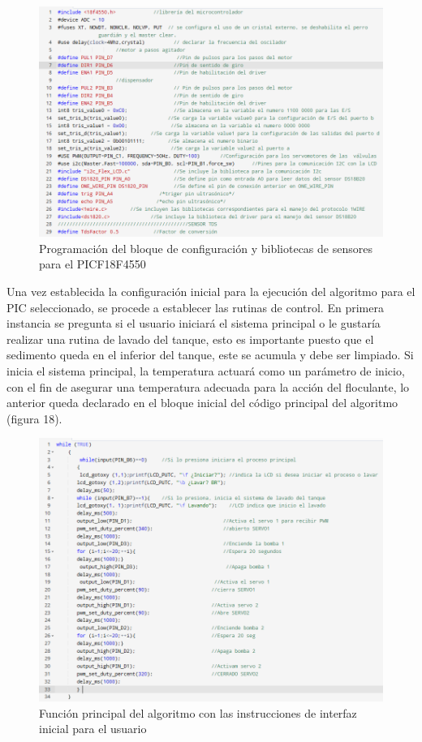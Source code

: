 \documentclass[conference]{IEEEtran}
\begin{document}
\begin{figure}[htbp]
	\centering
	\includegraphics[width=0.9\columnwidth]{fig17.png}
	\caption{Programación del bloque de configuración y bibliotecas de sensores para el PICF18F4550}
	\label{fig:sensor-ph-temperatura}
\end{figure}

Una vez establecida la configuración inicial para la ejecución del algoritmo para el PIC seleccionado, se procede a establecer las rutinas de control. En primera instancia se pregunta si el usuario iniciará el sistema principal o le gustaría realizar una rutina de lavado del tanque, esto es importante puesto que el sedimento queda en el inferior del tanque, este se acumula y debe ser limpiado. Si inicia el sistema principal, la temperatura actuará como un parámetro de inicio, con el fin de asegurar una temperatura adecuada para la acción del floculante, lo anterior queda declarado en el bloque inicial del código principal del algoritmo (figura 18).

\begin{figure}[htbp]
	\centering
	\includegraphics[width=0.9\columnwidth]{fig18.png}
	\caption{Función principal del algoritmo con las instrucciones de interfaz inicial para el usuario}
	\label{fig:sensor-ph-temperatura}
\end{figure}
\end{document}
